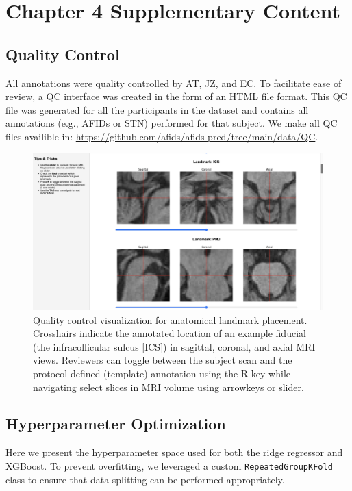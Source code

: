 \chapter{Chapter 4 Supplementary Content}\label{app:suppcontentch4}
\newpage

\section{Quality Control}\label{app:qualitycontrol}
All annotations were quality controlled by AT, JZ, and EC. To facilitate ease of review, a QC interface was created in the form of an HTML file format. This QC file was generated for all the participants in the dataset and contains all annotations (e.g., AFIDs or STN) performed for that subject. We make all QC files availible in: \url{https://github.com/afids/afids-pred/tree/main/data/QC}.

\begin{figure}[hbt!]
    \centering
    \includegraphics[width=1\linewidth]{figs/figuresupQC.png}
    \caption{Quality control visualization for anatomical landmark placement. Crosshairs indicate the annotated location of an example fiducial (the infracollicular sulcus [ICS]) in sagittal, coronal, and axial MRI views. Reviewers can toggle between the subject scan and the protocol-defined (template) annotation using the R key while navigating select slices in MRI volume using arrowkeys or slider.}
    \label{fig:figuresupQC}
\end{figure}

\newpage
\section{Hyperparameter Optimization}
Here we present the hyperparameter space used for both the ridge regressor and XGBoost. To prevent overfitting, we leveraged a custom \texttt{RepeatedGroupKFold} class to ensure that data splitting can be performed appropriately. 


